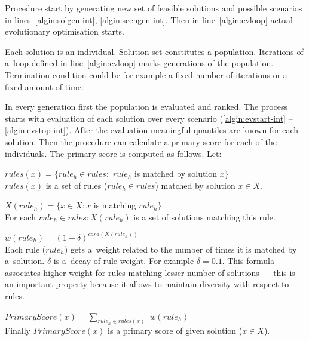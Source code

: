 Procedure start by generating new set of feasible solutions and possible
scenarios in lines~\ref{algin:solgen-int}, \ref{algin:scengen-int}. Then in
line~\ref{algin:evloop} actual evolutionary optimisation starts.

Each solution is an individual. Solution set constitutes a
population. Iterations of a~loop defined in line~\ref{algin:evloop} marks 
generations of the population. Termination condition could be for example
a fixed number of iterations or a fixed amount of time.

In every generation first the population is evaluated and ranked. The process
starts with evaluation of each solution over every scenario
(\ref{algin:evstart-int} -- \ref{algin:evstop-int}). After the evaluation
meaningful quantiles are known for each solution. Then the procedure can
calculate a primary score for each of the individuals. The primary score is
computed as follows. Let:

\begin{description}
\item $\textit{rules}(x) = \{\textit{rule}_h \in \textit{rules} :$
$\textit{rule}_h$ is matched by solution $x\}$ \\
$\textit{rules}(x)$ is a set of rules ($\textit{rule}_h \in \textit{rules}$)
matched by solution $x \in X$. 

\item $X(\textit{rule}_h) = \{x \in X: x$ is matching $\textit{rule}_h\}$
\\ For each $\textit{rule}_h \in rules: X(\textit{rule}_h)$ is a set of
solutions matching this rule.

\item $w(\textit{rule}_h) = (1 - \delta)^{\textit{card}(X(\textit{rule}_h))}$
  \\ Each rule ($\textit{rule}_h$) gets a~weight related to the number of
  times it is matched by a~solution. $\delta$ is a~decay of rule weight. For
  example $\delta = 0.1$. This formula associates higher weight for rules
  matching lesser number of solutions --- this is an important property
  because it allows to maintain diversity with respect to rules.

\item $\textit{PrimaryScore}(x) = \sum_{\textit{rule}_h \in rules(x)}$
  $w(\textit{rule}_h)$ \\
Finally $\textit{PrimaryScore}(x)$ is a primary score of given solution ($x \in X$).
\end{description}

